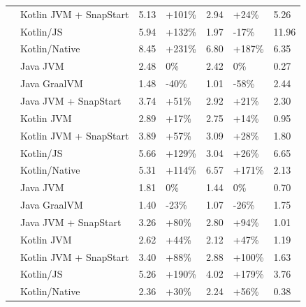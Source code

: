 \begin{table}[h!]
\begin{tabular}{|>{\centering\arraybackslash}m{1.5cm}|l|p{1.5cm}|p{1.5cm}|p{1.5cm}|p{1.5cm}|p{1.5cm}|}
 & Kotlin JVM + SnapStart & 5.13 & \mbox{+101\%} & 2.94 & \mbox{+24\%} & 5.26 \\
 & Kotlin/JS & 5.94 & \mbox{+132\%} & 1.97 & \mbox{-17\%} & 11.96 \\
 & Kotlin/Native & 8.45 & \mbox{+231\%} & 6.80 & \mbox{+187\%} & 6.35 \\
\midrule
\multirow{7}{*}{1024} & Java JVM & 2.48 & \mbox{0\%} & 2.42 & \mbox{0\%} & 0.27 \\
 & Java GraalVM & 1.48 & \mbox{-40\%} & 1.01 & \mbox{-58\%} & 2.44 \\
 & Java JVM + SnapStart & 3.74 & \mbox{+51\%} & 2.92 & \mbox{+21\%} & 2.30 \\
 & Kotlin JVM & 2.89 & \mbox{+17\%} & 2.75 & \mbox{+14\%} & 0.95 \\
 & Kotlin JVM + SnapStart & 3.89 & \mbox{+57\%} & 3.09 & \mbox{+28\%} & 1.80 \\
 & Kotlin/JS & 5.66 & \mbox{+129\%} & 3.04 & \mbox{+26\%} & 6.65 \\
 & Kotlin/Native & 5.31 & \mbox{+114\%} & 6.57 & \mbox{+171\%} & 2.13 \\
\midrule
\multirow{7}{*}{2048} & Java JVM & 1.81 & \mbox{0\%} & 1.44 & \mbox{0\%} & 0.70 \\
 & Java GraalVM & 1.40 & \mbox{-23\%} & 1.07 & \mbox{-26\%} & 1.75 \\
 & Java JVM + SnapStart & 3.26 & \mbox{+80\%} & 2.80 & \mbox{+94\%} & 1.01 \\
 & Kotlin JVM & 2.62 & \mbox{+44\%} & 2.12 & \mbox{+47\%} & 1.19 \\
 & Kotlin JVM + SnapStart & 3.40 & \mbox{+88\%} & 2.88 & \mbox{+100\%} & 1.63 \\
 & Kotlin/JS & 5.26 & \mbox{+190\%} & 4.02 & \mbox{+179\%} & 3.76 \\
 & Kotlin/Native & 2.36 & \mbox{+30\%} & 2.24 & \mbox{+56\%} & 0.38 \\
\bottomrule
\end{tabular}
\label{table:warm_start_comparison}
\end{table}

